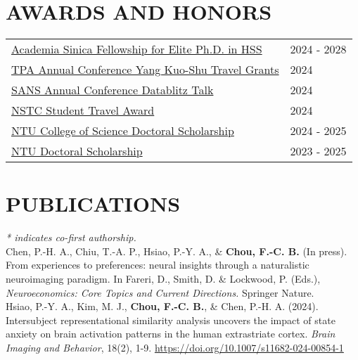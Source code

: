 \documentclass[a4paper,12pt]{article}
\newcommand{\itemspace}{7pt} %
\begin{document}
\section*{AWARDS AND HONORS}
\begin{flushright}
\begin{tabular}{@{}p{}@{}p{}@{}}
\href{https://www.sinica.edu.tw/en/News_Content/56/2728}{Academia Sinica Fellowship for Elite Ph.D. in HSS} & \hfill 2024 - 2028 \\[2pt]
\href{https://www.tpa-tw.org/post/2024travel-grant}{TPA Annual Conference Yang Kuo-Shu Travel Grants} & \hfill 2024\\[2pt]
\href{https://socialaffectiveneuro.org/wp-content/uploads/2024/05/SANS-Conference-2024_Program_Final.pdf}{SANS Annual Conference Datablitz Talk} & \hfill 2024\\[2pt]
\href{https://www.nstc.gov.tw/sci/ch/detail/259f99f5-51ce-4582-8546-9d7caee96871}{NSTC Student Travel Award}  & \hfill 2024\\[2pt]
\href{https://www.science.ntu.edu.tw/file/rule50.pdf}{NTU College of Science Doctoral Scholarship}  & \hfill 2024 - 2025\\[2pt]
\href{https://ord.ntu.edu.tw/w/ordntu/GW_20072012180521920/}{NTU Doctoral Scholarship}  & \hfill 2023 - 2025\\[2pt]
\end{tabular}
\end{flushright}

\section*{PUBLICATIONS}
\textit{* indicates co-first authorship.} \\[10pt]
\noindent Chen, P.-H. A., Chiu, T.-A. P., Hsiao, P.-Y. A., \& \textbf{Chou, F.-C. B.} (In press). From experiences to preferences: neural insights through a naturalistic neuroimaging paradigm. In Fareri, D., Smith, D. \& Lockwood, P. (Eds.), \textit{Neuroeconomics: Core Topics and Current Directions.} Springer Nature.\\[\itemspace]
\noindent Hsiao, P.-Y. A., Kim, M. J., \textbf{Chou, F.-C. B.}, \& Chen, P.-H. A. (2024). Intersubject representational similarity analysis uncovers the impact of state anxiety on brain activation patterns in the human extrastriate cortex. \textit{Brain Imaging and Behavior}, 18(2), 1-9. \href{https://doi.org/10.1007/s11682-024-00854-1}{https://doi.org/10.1007/s11682-024-00854-1}
\\[\itemspace]
\end{document}
